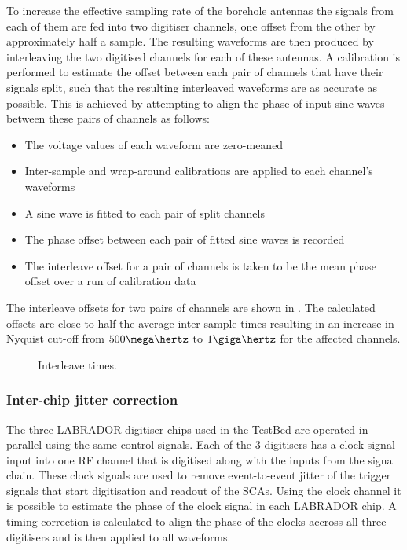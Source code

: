 To increase the effective sampling rate of the borehole antennas the signals from each of them are fed into two digitiser channels, one offset from the other by approximately half a sample. The resulting waveforms are then produced by interleaving the two digitised channels for each of these antennas. A calibration is performed to estimate the offset between each pair of channels that have their signals split, such that the resulting interleaved waveforms are as accurate as possible. This is achieved by attempting to align the phase of input sine waves between these pairs of channels as follows:

\begin{itemize}
\item The voltage values of each waveform are zero-meaned
\item Inter-sample and wrap-around calibrations are applied to each channel's waveforms
\item A sine wave is fitted to each pair of split channels
\item The phase offset between each pair of fitted sine waves is recorded
\item The interleave offset for a pair of channels is taken to be the mean phase offset over a run of calibration data
\end{itemize}

The interleave offsets for two pairs of channels are shown in . The calculated offsets are close to half the average inter-sample times resulting in an increase in Nyquist cut-off from $500 \mega\hertz$ to $1\giga\hertz$ for the affected channels.

\begin{figure}[htpb]
  \hfill
  \caption{Interleave times.}
  \label{fig:calibration:LABRADOR-Digitiser-Chip:Interleave}
\end{figure}


\subsubsection{Inter-chip jitter correction}
\label{sec:calibration:LABRADOR-Digitiser-Chip:Inter-chip-jitter-correction}

The three LABRADOR digitiser chips used in the TestBed are operated in parallel using the same control signals. Each of the 3 digitisers has a clock signal input into one RF channel that is digitised along with the inputs from the signal chain. These clock signals are used to remove event-to-event jitter of the trigger signals that start digitisation and readout of the SCAs. Using the clock channel it is possible to estimate the phase of the clock signal in each LABRADOR chip. A timing correction is calculated to align the phase of the clocks accross all three digitisers and is then applied to all waveforms.


